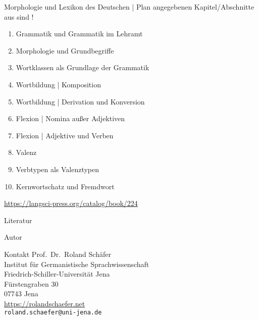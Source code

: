 \documentclass[handout,aspectratio=1610,dvipsnames]{beamer}
\begin{document}
  \begin{frame}
    {Morphologie und Lexikon des Deutschen | Plan}
     angegebenen Kapitel\slash Abschnitte aus  sind !\\
    \Halbzeile
    \begin{enumerate}
      \item Grammatik und Grammatik im Lehramt 
      \item Morphologie und Grundbegriffe 
      \item Wortklassen als Grundlage der Grammatik 
      \item Wortbildung | Komposition 
      \item Wortbildung | Derivation und Konversion 
      \item Flexion | Nomina außer Adjektiven 
      \item Flexion | Adjektive und Verben 
      \item Valenz 
      \item Verbtypen als Valenztypen 
      \item Kernwortschatz und Fremdwort 
    \end{enumerate}
    \Halbzeile
    \centering 
    \url{https://langsci-press.org/catalog/book/224}
  \end{frame}

\fi

\makeatletter
\setcounter{lastpagemainpart}{\the\c@framenumber}
\makeatother

\appendix

\begin{frame}[allowframebreaks]
  {Literatur}
  \renewcommand*{\bibfont}{\footnotesize}
  \printbibliography
\end{frame}

\begin{frame}
  {Autor}
  \begin{block}{Kontakt}
    Prof.\ Dr.\ Roland Schäfer\\
    Institut für Germanistische Sprachwissenschaft\\
    Friedrich-Schiller-Universität Jena\\
    Fürstengraben 30\\
    07743 Jena\\[\baselineskip]
    \url{https://rolandschaefer.net}\\
    \texttt{roland.schaefer@uni-jena.de}
  \end{block}
\end{frame}
\end{document}

